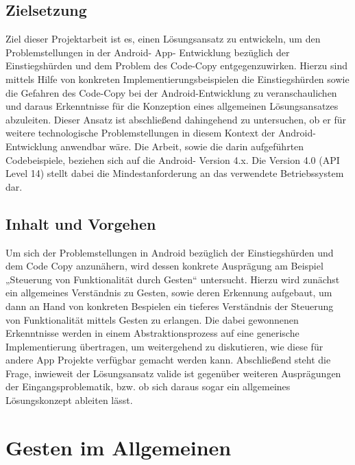 \documentclass[12pt,oneside,a4paper,bibtotoc,liststotoc]{scrreprt}
\begin{document}
\section{Zielsetzung}
Ziel dieser Projektarbeit ist es, einen Lösungsansatz zu entwickeln, um den Problemstellungen in der Android- App- Entwicklung bezüglich der Einstiegshürden und dem Problem des Code-Copy entgegenzuwirken. Hierzu sind mittels Hilfe von konkreten Implementierungsbeispielen die Einstiegshürden sowie die Gefahren des Code-Copy bei der Android-Entwicklung zu veranschaulichen und daraus Erkenntnisse für die Konzeption eines allgemeinen Lösungsansatzes abzuleiten. Dieser Ansatz ist abschließend dahingehend zu untersuchen, ob er für weitere technologische Problemstellungen in diesem Kontext der Android- Entwicklung anwendbar wäre. Die Arbeit, sowie die darin aufgeführten Codebeispiele, beziehen sich auf die Android- Version 4.x. Die Version 4.0 (API Level 14) stellt dabei die Mindestanforderung an das verwendete Betriebssystem dar.

\section{Inhalt und Vorgehen}
Um sich der Problemstellungen in Android bezüglich der Einstiegshürden und dem Code Copy anzunähern, wird dessen konkrete Ausprägung am Beispiel „Steuerung von Funktionalität durch Gesten“ untersucht. Hierzu wird zunächst ein allgemeines Verständnis zu Gesten, sowie deren Erkennung aufgebaut, um dann an Hand von konkreten Bespielen ein tieferes Verständnis der Steuerung von Funktionalität mittels Gesten zu erlangen. Die dabei gewonnenen Erkenntnisse werden in einem Abstraktionsprozess auf eine generische Implementierung übertragen, um weitergehend zu diskutieren, wie diese für andere App Projekte verfügbar gemacht werden kann.\newline
Abschließend steht die Frage, inwieweit der Lösungsansatz valide ist gegenüber weiteren Ausprägungen der Eingangsproblematik, bzw. ob sich daraus sogar ein allgemeines Lösungskonzept ableiten lässt.

\chapter{Gesten im Allgemeinen}
\end{document}
